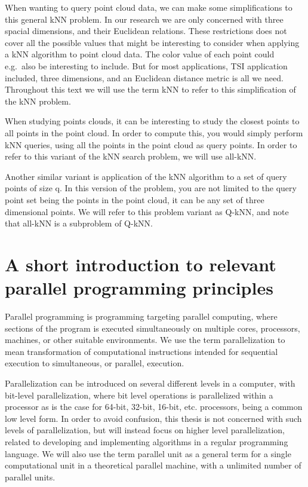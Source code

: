When wanting to query point cloud data, we can make some simplifications to this general kNN problem. In our research we are only concerned with three spacial dimensions, and their Euclidean relations. These restrictions does not cover all the possible values that might be interesting to consider when applying a kNN algorithm to point cloud data. The color value of each point could e.g.\ also be interesting to include. But for most applications, TSI application included, three dimensions, and an Euclidean distance metric is all we need. Throughout this text we will use the term kNN to refer to this simplification of the kNN problem.

When studying points clouds, it can be interesting to study the closest points to all points in the point cloud. In order to compute this, you would simply perform kNN queries, using all the points in the point cloud as query points. In order to refer to this variant of the kNN search problem, we will use all-kNN\@.

Another similar variant is application of the kNN algorithm to a set of query points of size q. In this version of the problem, you are not limited to the query point set being the points in the point cloud, it can be any set of three dimensional points. We will refer to this problem variant as Q-kNN, and note that all-kNN is a subproblem of Q-kNN\@.

\section{A short introduction to relevant parallel programming principles} %
\label{sub:a_short_introduction_to_relevant_parallel_programming_principles}

Parallel programming is programming targeting parallel computing, where sections of the program is executed simultaneously on multiple cores, processors, machines, or other suitable environments. We use the term parallelization to mean transformation of computational instructions intended for sequential execution to simultaneous, or parallel, execution.

Parallelization can be introduced on several different levels in a computer, with bit-level parallelization, where bit level operations is parallelized within a processor as is the case for 64-bit, 32-bit, 16-bit, etc. processors, being a common low level form. In order to avoid confusion, this thesis is not concerned with such levels of parallelization, but will instead focus on higher level parallelization, related to developing and implementing algorithms in a regular programming language. We will also use the term parallel unit as a general term for a single computational unit in a theoretical parallel machine, with a unlimited number of parallel units.

